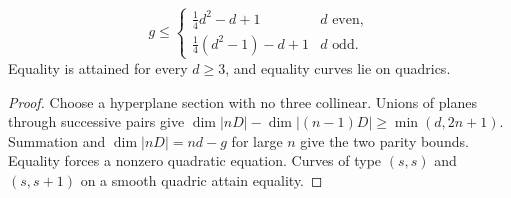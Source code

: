 \begin{theorem}[Castelnuovo]\label{ha-ch4-t64}
\[
g\le\begin{cases}\frac14d^2-d+1&d\text{ even},\\
\frac14(d^2-1)-d+1&d\text{ odd}.\end{cases}
\]
Equality is attained for every \(d\ge3\), and equality curves lie on quadrics.
\end{theorem}
\begin{proof}Choose a hyperplane section with no three collinear.  Unions of
planes through successive pairs give
\(\dim|nD|-\dim|(n-1)D|\ge\min(d,2n+1)\).  Summation and
\(\dim|nD|=nd-g\) for large \(n\) give the two parity bounds.  Equality forces
a nonzero quadratic equation.  Curves of type \((s,s)\) and \((s,s+1)\) on a
smooth quadric attain equality.\end{proof}
